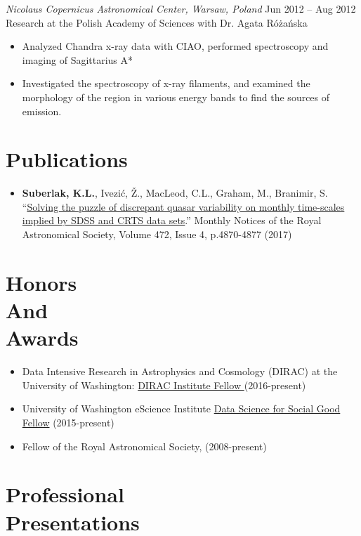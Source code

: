 \documentclass[margin]{res}
\begin{document}
\begin{resume}
{\sl Nicolaus Copernicus Astronomical Center, Warsaw, Poland}  \hfill   Jun 2012 -- Aug 2012 \\
Research at the Polish Academy of Sciences with Dr. Agata R\'{o}\.{z}a\'{n}ska
\begin{itemize}
	\item Analyzed Chandra x-ray data with CIAO, performed  spectroscopy and imaging of Sagittarius A*
	\item Investigated the spectroscopy of x-ray filaments, and examined the morphology of the region in various energy bands to find the sources of emission.
\end{itemize}



\section{Publications}
\begin{itemize}   
\item \textbf{Suberlak, K.L.}, Ivezi\'c, \v{Z}., MacLeod, C.L., Graham, M., Branimir, S. ``\href{https://doi.org/10.1093/mnras/stx2310}{Solving the puzzle of discrepant quasar variability on monthly time-scales implied by SDSS and CRTS data sets}.'' Monthly Notices of the Royal Astronomical Society, Volume 472, Issue 4, p.4870-4877 (2017)

\end{itemize}


\section{Honors\\And\\Awards} 
\begin{itemize}  

\item Data Intensive Research in Astrophysics and Cosmology (DIRAC) at the University of Washington: \href{https://dirac.astro.washington.edu}{DIRAC Institute Fellow }(2016-present) 
\item University of Washington eScience Institute \href{https://escience.washington.edu/dssg/}{Data Science for Social Good Fellow} (2015-present)
\item Fellow of the Royal Astronomical Society, (2008-present) \\
\end{itemize}
                 


\section{Professional\\ Presentations} 
\begin{itemize}  %


\end{itemize}
\end{resume}
\end{document}
